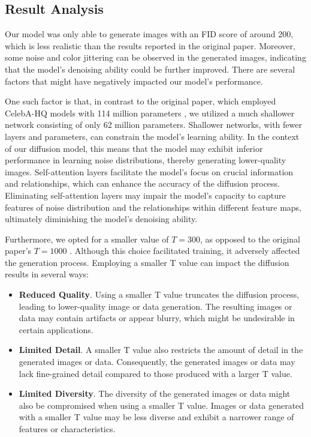 \documentclass[letterpaper]{article} %
\begin{document}
\subsection{Result Analysis}
Our model was only able to generate images with an FID score of around 200, which is less realistic than the results reported in the original paper. Moreover, some noise and color jittering can be observed in the generated images, indicating that the model's denoising ability could be further improved. There are several factors that might have negatively impacted our model's performance.

One such factor is that, in contrast to the original paper, which employed CelebA-HQ models with 114 million parameters \cite{2020denoising}, we utilized a much shallower network consisting of only 62 million parameters. Shallower networks, with fewer layers and parameters, can constrain the model's learning ability. In the context of our diffusion model, this means that the model may exhibit inferior performance in learning noise distributions, thereby generating lower-quality images. Self-attention layers facilitate the model's focus on crucial information and relationships, which can enhance the accuracy of the diffusion process. Eliminating self-attention layers may impair the model's capacity to capture features of noise distribution and the relationships within different feature maps, ultimately diminishing the model's denoising ability.

Furthermore, we opted for a smaller value of $T = 300$, as opposed to the original paper's $T = 1000$ \cite{2020denoising}. Although this choice facilitated training, it adversely affected the generation process. Employing a smaller T value can impact the diffusion results in several ways:

\begin{itemize}
\item \textbf{Reduced Quality}. Using a smaller T value truncates the diffusion process, leading to lower-quality image or data generation. The resulting images or data may contain artifacts or appear blurry, which might be undesirable in certain applications.
\item \textbf{Limited Detail}. A smaller T value also restricts the amount of detail in the generated images or data. Consequently, the generated images or data may lack fine-grained detail compared to those produced with a larger T value.
\item \textbf{Limited Diversity}. The diversity of the generated images or data might also be compromised when using a smaller T value. Images or data generated with a smaller T value may be less diverse and exhibit a narrower range of features or characteristics.
\end{itemize}
\end{document}
